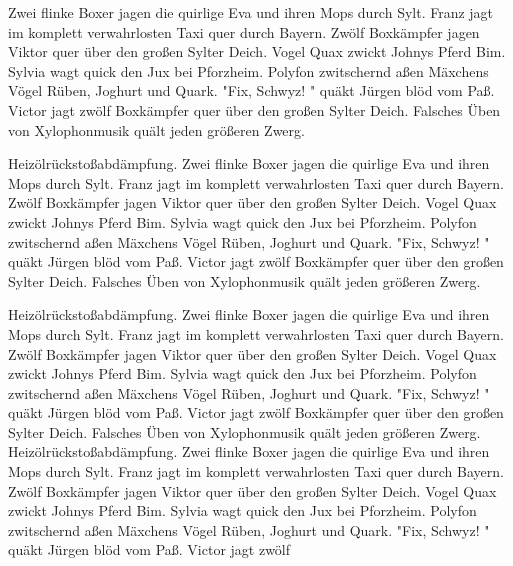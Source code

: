 Zwei flinke Boxer jagen die quirlige Eva und ihren Mops durch Sylt. Franz jagt im komplett verwahrlosten Taxi quer durch Bayern. Zwölf Boxkämpfer jagen Viktor quer über den großen Sylter Deich. Vogel Quax zwickt Johnys Pferd Bim. Sylvia wagt quick den Jux bei Pforzheim. Polyfon zwitschernd aßen Mäxchens Vögel Rüben, Joghurt und Quark. "Fix, Schwyz! " quäkt Jürgen blöd vom Paß. Victor jagt zwölf Boxkämpfer quer über den großen Sylter Deich. Falsches Üben von Xylophonmusik quält jeden größeren Zwerg.

Heizölrückstoßabdämpfung. Zwei flinke Boxer jagen die quirlige Eva und ihren Mops durch Sylt. Franz jagt im komplett verwahrlosten Taxi quer durch Bayern. Zwölf Boxkämpfer jagen Viktor quer über den großen Sylter Deich. Vogel Quax zwickt Johnys Pferd Bim. Sylvia wagt quick den Jux bei Pforzheim. Polyfon zwitschernd aßen Mäxchens Vögel Rüben, Joghurt und Quark. "Fix, Schwyz! " quäkt Jürgen blöd vom Paß. Victor jagt zwölf Boxkämpfer quer über den großen Sylter Deich. Falsches Üben von Xylophonmusik quält jeden größeren Zwerg.

Heizölrückstoßabdämpfung. Zwei flinke Boxer jagen die quirlige Eva und ihren Mops durch Sylt. Franz jagt im komplett verwahrlosten Taxi quer durch Bayern. Zwölf Boxkämpfer jagen Viktor quer über den großen Sylter Deich. Vogel Quax zwickt Johnys Pferd Bim. Sylvia wagt quick den Jux bei Pforzheim. Polyfon zwitschernd aßen Mäxchens Vögel Rüben, Joghurt und Quark. "Fix, Schwyz! " quäkt Jürgen blöd vom Paß. Victor jagt zwölf Boxkämpfer quer über den großen Sylter Deich. Falsches Üben von Xylophonmusik quält jeden größeren Zwerg. Heizölrückstoßabdämpfung. Zwei flinke Boxer jagen die quirlige Eva und ihren Mops durch Sylt. Franz jagt im komplett verwahrlosten Taxi quer durch Bayern. Zwölf Boxkämpfer jagen Viktor quer über den großen Sylter Deich. Vogel Quax zwickt Johnys Pferd Bim. Sylvia wagt quick den Jux bei Pforzheim. Polyfon zwitschernd aßen Mäxchens Vögel Rüben, Joghurt und Quark. "Fix, Schwyz! " quäkt Jürgen blöd vom Paß. Victor jagt zwölf


